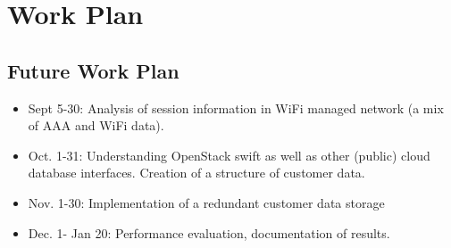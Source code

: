 \chapter{Work Plan} \label{chap:wp} %


\section{Future Work Plan}
\hspace{0.5cm} 

\begin{itemize}
    \item Sept 5-30: Analysis of session information in WiFi managed network (a mix of AAA and WiFi data).
    \item Oct. 1-31: Understanding OpenStack swift as well as other (public) cloud database interfaces. Creation of a structure of customer data.
    \item Nov. 1-30: Implementation of a redundant customer data storage
    \item Dec. 1- Jan 20: Performance evaluation, documentation of results.
\end{itemize}

